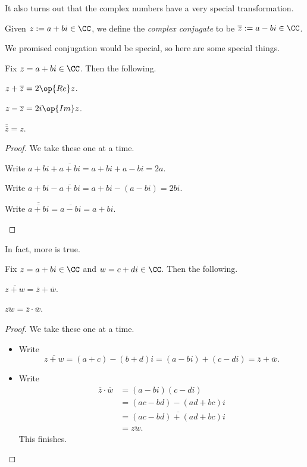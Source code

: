 It also turns out that the complex numbers have a very special transformation.
\begin{definition}[Conjugate]
	Given $z:=a+bi\in\CC$, we define the \textit{complex conjugate} to be $\overline z:=a-bi\in\CC$.
\end{definition}
We promised conjugation would be special, so here are some special things.
\begin{proposition}
	Fix $z=a+bi\in\CC$. Then the following.
	\begin{listalph}
		\item $z+\overline z=2\op{Re}z$.
		\item $z-\overline z=2i\op{Im}z$.
		\item $\overline{\overline z}=z$.
	\end{listalph}
\end{proposition}
\begin{proof}
	We take these one at a time.
	\begin{listalph}
		\item Write $a+bi+\overline{a+bi}=a+bi+a-bi=2a$.
		\item Write $a+bi-\overline{a+bi}=a+bi-(a-bi)=2bi$.
		\item Write $\overline{\overline{a+bi}}=\overline{a-bi}=a+bi$.
		\qedhere
	\end{listalph}
\end{proof}
In fact, more is true.
\begin{proposition}
	Fix $z=a+bi\in\CC$ and $w=c+di\in\CC$. Then the following.
	\begin{listalph}
		\item $\overline{z+w}=\overline z+\overline w$.
		\item $\overline{zw}=\overline z\cdot\overline w$.
	\end{listalph}
\end{proposition}
\begin{proof}
	We take these one at a time.
	\begin{itemize}
		\item Write
		\[\overline{z+w}=(a+c)-(b+d)i=(a-bi)+(c-di)=\overline z+\overline w.\]
		\item Write
		\begin{align*}
			\overline z\cdot\overline w &= (a-bi)(c-di) \\
			&= (ac-bd)-(ad+bc)i \\
			&= \overline{(ac-bd)+(ad+bc)i} \\
			&= \overline{zw}.
		\end{align*}
		This finishes.
		\qedhere
	\end{itemize}
\end{proof}

